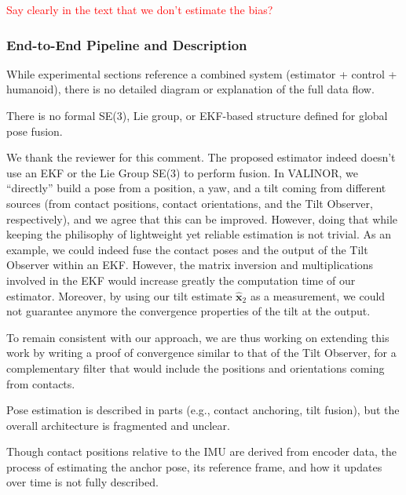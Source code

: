 \textcolor{red}{Say clearly in the text that we don't estimate the bias?}

 

\subsubsection{End-to-End Pipeline and Description}


\begin{revquote}
While experimental sections reference a combined system (estimator + control + humanoid), there is no detailed diagram or explanation of the full data flow.
\end{revquote}

\begin{revquote}
There is no formal SE(3), Lie group, or EKF-based structure defined for global pose fusion.
\end{revquote}

We thank the reviewer for this comment. The proposed estimator indeed doesn't use an EKF or the Lie Group SE(3) to perform fusion. In VALINOR, we ``directly'' build a pose from a position, a yaw, and a tilt coming from different sources (from contact positions, contact orientations, and the Tilt Observer, respectively), and we agree that this can be improved. However, doing that while keeping the philisophy of lightweight yet reliable estimation is not trivial. 
As an example, we could indeed fuse the contact poses and the output of the Tilt Observer within an EKF. However, the matrix inversion and multiplications involved in the EKF would increase greatly the computation time of our estimator. Moreover, by using our tilt estimate $\hat{\boldsymbol{x}}_{2}$ as a measurement, we could not guarantee anymore the convergence properties of the tilt at the output.

To remain consistent with our approach, we are thus working on extending this work by writing a proof of convergence similar to that of the Tilt Observer, for a complementary filter that would include the positions and orientations coming from contacts.  

\begin{revquote}
Pose estimation is described in parts (e.g., contact anchoring, tilt fusion), but the overall architecture is fragmented and unclear.
\end{revquote}

\io

\begin{revquote}
Though contact positions relative to the IMU are derived from encoder data, the process of estimating the anchor pose, its reference frame, and how it updates over time is not fully described.
\end{revquote}


